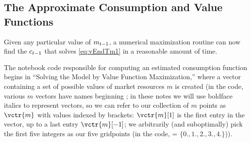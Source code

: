 \documentclass[\econtexRoot/SolvingMicroDSOPs]{subfiles}
\begin{document}
\hypertarget{the-approximate-consumption-and-value-functions}{}
\subsection{The Approximate Consumption and Value Functions}

Given any particular value of ${m}_{t-1}$, a numerical maximization routine can now find the ${c}_{t-1}$ that solves \eqref{eq:vEndTm1} in a reasonable amount of time.

\begin{comment}

\end{comment}

The notebook code responsible for computing an estimated consumption function begins in ``Solving the Model by Value Function Maximization,'' where a vector containing a set of possible values of market resources ${m}$ is created (in the code, various $m$ vectors have names beginning {\mVec}; in these notes we will use boldface italics to represent vectors, so we can refer to our collection of ${m}$ points as $\vctr{m}$ with values indexed by brackets: $\vctr{m}[1]$ is the first entry in the vector, up to a last entry $\vctr{m}[-1]$; we arbitrarily (and suboptimally) pick the first five integers as our five {\mVec}  gridpoints (in the code, = $\{0.,1.,2.,3.,4.\}$)).

\end{document}
